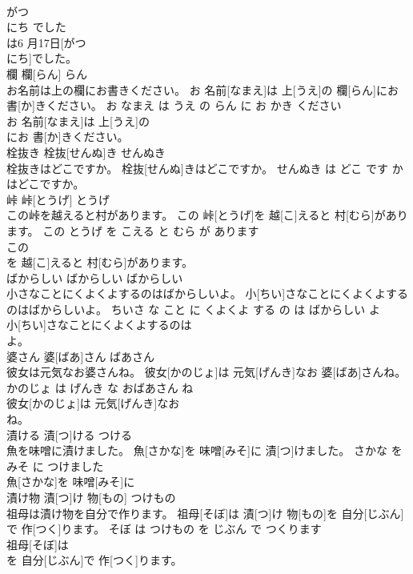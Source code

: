 \documentclass[8pt]{extreport}
\begin{document}
\begin{CJK}{UTF8}{min}
\\	がつ 
\\	にち でした	
\\	は6 月17日[がつ 
\\	にち]でした。			
\\	欄	欄[らん]	らん	
\\	お名前は上の欄にお書きください。	お 名前[なまえ]は 上[うえ]の 欄[らん]にお 書[か]きください。	お なまえ は うえ の らん に お かき ください	
\\	お 名前[なまえ]は 上[うえ]の
\\	にお 書[か]きください。			
\\	栓抜き	栓抜[せんぬ]き	せんぬき	
\\	栓抜きはどこですか。	栓抜[せんぬ]きはどこですか。	せんぬき は どこ です か	
\\	はどこですか。			
\\	峠	峠[とうげ]	とうげ	
\\	この峠を越えると村があります。	この 峠[とうげ]を 越[こ]えると 村[むら]があります。	この とうげ を こえる と むら が あります	
\\	この
\\	を 越[こ]えると 村[むら]があります。			
\\	ばからしい	ばからしい	ばからしい	
\\	小さなことにくよくよするのはばからしいよ。	小[ちい]さなことにくよくよするのはばからしいよ。	ちいさ な こと に くよくよ する の は ばからしい よ	
\\	小[ちい]さなことにくよくよするのは
\\	よ。			
\\	婆さん	婆[ばあ]さん	ばあさん	
\\	彼女は元気なお婆さんね。	彼女[かのじょ]は 元気[げんき]なお 婆[ばあ]さんね。	かのじょ は げんき な おばあさん ね	
\\	彼女[かのじょ]は 元気[げんき]なお
\\	ね。			
\\	漬ける	漬[つ]ける	つける	
\\	魚を味噌に漬けました。	魚[さかな]を 味噌[みそ]に 漬[つ]けました。	さかな を みそ に つけました	
\\	魚[さかな]を 味噌[みそ]に
\\	漬け物	漬[つ]け 物[もの]	つけもの	
\\	祖母は漬け物を自分で作ります。	祖母[そぼ]は 漬[つ]け 物[もの]を 自分[じぶん]で 作[つく]ります。	そぼ は つけもの を じぶん で つくります	
\\	祖母[そぼ]は
\\	を 自分[じぶん]で 作[つく]ります。			

\end{CJK}
\end{document}
